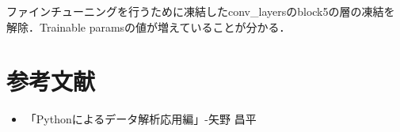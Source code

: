 \documentclass[uplatex,titlepage]{jsarticle}
\newif\iffigure
\begin{document}
\iffigure
\begin{figure}[H]
\begin{minipage}{8cm}%
  \begin{center}
   \texttt{[image: finetyu\_acc.png]} \\
   \caption{重みを凍結して学習したときの正答率の推移}
  \end{center}
\end{minipage}
\hfill
\begin{minipage}{8cm}%
  \begin{center}
    \texttt{[image: finetyu\_loss.png]} \\
    \caption{重みを凍結して学習したときの損失の推移}
  \end{center}
\end{minipage}
\end{figure}
\fi

ファインチューニングを行うために凍結したconv\_layersのblock5の層の凍結を解除．Trainable paramsの値が増えていることが分かる．
\iffigure
\begin{figure}[H]%
    \begin{center}
    \texttt{[image: finetyu\_after.png]} 
    \caption{ファインチューニングに用いた学習モデル}
    \end{center}
\end{figure}
\fi

\iffigure
\begin{figure}[H]
\begin{minipage}{8cm}%
  \begin{center}
   \texttt{[image: finetyu\_after\_acc.png]} \\
   \caption{凍結解除して学習したときの正答率の推移}
  \end{center}
\end{minipage}
\hfill
\begin{minipage}{8cm}%
  \begin{center}
    \texttt{[image: finetyu\_after\_loss.png]} \\
    \caption{凍結解除して学習したときの損失の推移}
  \end{center}
\end{minipage}
\end{figure}
\fi



\section{参考文献}
\begin{itemize}
  \item 「Pythonによるデータ解析応用編」-矢野 昌平
\end{itemize}
\end{document}
